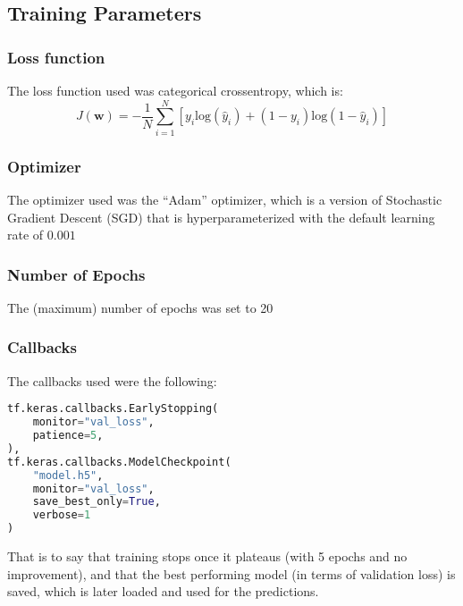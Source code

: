 \documentclass[conference]{IEEEtran}
\begin{document}
\subsection{Training Parameters}
\subsubsection{Loss function}
The loss function used was categorical crossentropy, which is:
\begin{equation}
    J(\textbf{w}) = -\frac{1}{N} \sum_{i=1}^{N} \left[ y_i \text{log}(\hat{y}_i) + (1-y_i) \text{log}(1-\hat{y}_i) \right]
\end{equation}
\subsubsection{Optimizer}
The optimizer used was the ``Adam'' optimizer, which is a version of Stochastic Gradient Descent (SGD)\cite{adam} that is hyperparameterized with the default learning rate of $0.001$
\subsubsection{Number of Epochs}
The (maximum) number of epochs was set to 20
\subsubsection{Callbacks}
The callbacks used were the following:
\begin{lstlisting}[language=Python]
tf.keras.callbacks.EarlyStopping( 
    monitor="val_loss",
    patience=5,
),
tf.keras.callbacks.ModelCheckpoint( 
    "model.h5",
    monitor="val_loss",
    save_best_only=True,
    verbose=1
)
\end{lstlisting}
That is to say that training stops once it plateaus (with 5 epochs and no improvement), and that the best performing model (in terms of validation loss) is saved, which is later loaded and used for the predictions.\@ 
\end{document}
